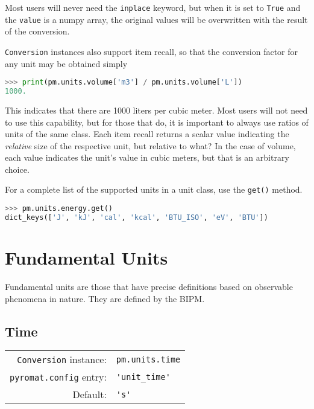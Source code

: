 Most users will never need the \verb|inplace| keyword, but when it is set to \verb|True| and the \verb|value| is a numpy array, the original values will be overwritten with the result of the conversion.  

\verb|Conversion| instances also support item recall, so that the conversion factor for any unit may be obtained simply
\begin{lstlisting}[language=Python]
>>> print(pm.units.volume['m3'] / pm.units.volume['L'])
1000.
\end{lstlisting}
This indicates that there are 1000 liters per cubic meter.  Most users will not need to use this capability, but for those that do, it is important to always use ratios of units of the same class.  Each item recall returns a scalar value indicating the \emph{relative} size of the respective unit, but relative to what?  In the case of volume, each value indicates the unit's value in cubic meters, but that is an arbitrary choice.

For a complete list of the supported units in a unit class, use the \verb|get()| method.
\begin{lstlisting}[language=Python]
>>> pm.units.energy.get()
dict_keys(['J', 'kJ', 'cal', 'kcal', 'BTU_ISO', 'eV', 'BTU'])
\end{lstlisting}


\section{Fundamental Units}

Fundamental units are those that have precise definitions based on observable phenomena in nature.  They are defined by the BIPM.

%
%

\subsection{Time}\label{sec:units:time}

\begin{tabular}{rl}
\hline
\verb|Conversion| instance: & \verb|pm.units.time|\\
\verb|pyromat.config| entry: & \verb|'unit_time'|\\
Default: & \verb|'s'|\\
\hline
\end{tabular}
\vspace{1em}

